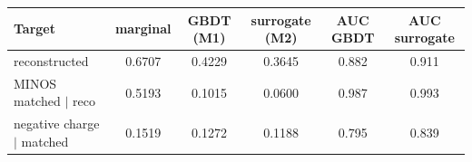 \begin{tabular}{lccccc}
\toprule
Target & marginal & GBDT (M1) & surrogate (M2) & AUC GBDT & AUC surrogate \\
\midrule
reconstructed & 0.6707 & 0.4229 & 0.3645 & 0.882 & 0.911 \\
MINOS matched $\mid$ reco & 0.5193 & 0.1015 & 0.0600 & 0.987 & 0.993 \\
negative charge $\mid$ matched & 0.1519 & 0.1272 & 0.1188 & 0.795 & 0.839 \\
\bottomrule
\end{tabular}

